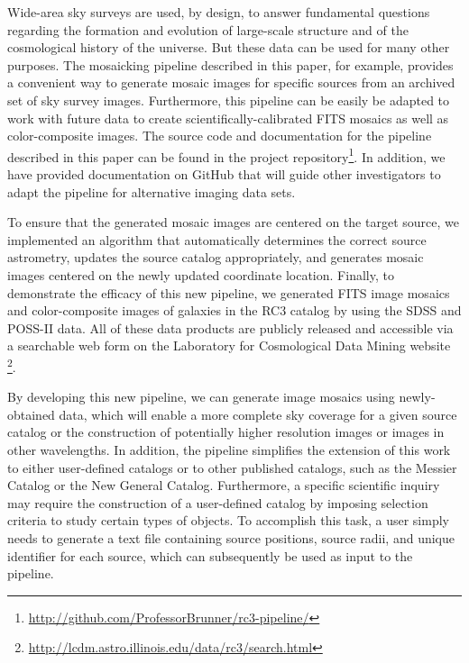 \documentclass[authoryear, 12pt, 5p, times]{elsarticle}
\begin{document}
Wide-area sky surveys are used, by design, to answer fundamental questions regarding the formation and evolution of large-scale structure and of the cosmological history of the universe. But these data can be used for many other purposes. The mosaicking pipeline described in this paper, for example, provides a convenient way to generate mosaic images for specific sources from an archived set of sky survey images.  Furthermore, this pipeline can be easily be adapted to work with future data to create scientifically-calibrated FITS mosaics as well as color-composite images. The source code and documentation for the pipeline described in this paper can be found in the project repository\footnote{\url{http://github.com/ProfessorBrunner/rc3-pipeline/}}. In addition, we have provided documentation on GitHub that will guide other investigators to adapt the pipeline for alternative imaging data sets.

To ensure that the generated mosaic images are centered on the target source, we implemented an algorithm that automatically determines the correct source astrometry, updates the source catalog appropriately, and generates mosaic images centered on the newly updated coordinate location. Finally, to demonstrate the efficacy of this new pipeline, we generated FITS image mosaics and color-composite images of galaxies in the RC3 catalog by using the SDSS and POSS-II data. All of these data products are publicly released and accessible via a searchable web form on the Laboratory for Cosmological Data Mining website \footnote{\url{http://lcdm.astro.illinois.edu/data/rc3/search.html}}.

By developing this new pipeline, we can generate image mosaics using newly-obtained data, which will enable a more complete sky coverage for a given source catalog or the construction of potentially higher resolution images or images in other wavelengths. In addition, the pipeline simplifies the extension of this work to either user-defined catalogs or to other published catalogs, such as the Messier Catalog or the New General Catalog. Furthermore, a specific scientific inquiry may require the construction of a user-defined catalog  by imposing selection criteria to study certain types of objects. To accomplish this task, a user simply needs to generate a text file containing source positions, source radii, and unique identifier for each source, which can subsequently be used as input to the pipeline. 
\end{document}
